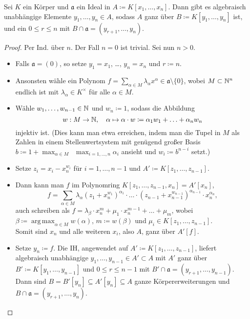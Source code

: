 \documentclass{cheat-sheet}
\DeclareMathOperator*{\argmax}{arg\,max}
\newcommand{\aaa}{\mathfrak{a}}
\begin{document}
\begin{prop}
  Sei $K$ ein Körper und $\aaa$ ein Ideal in $A \coloneqq K[x_1, \ldots, x_n]$.
  Dann gibt es algebraisch unabhängige Elemente $y_1, \ldots, y_n \in A$, sodass $A$ ganz über $B \coloneqq K[y_1, \ldots, y_n]$ ist, und ein $0 \leq r \leq n$ mit $B \cap \aaa = (y_{r+1}, \ldots, y_n)$.
\end{prop}

\begin{proof}
  Per Ind. über $n$. Der Fall $n=0$ ist trivial. Sei nun $n > 0$.
  \begin{itemize}
    \item Falls $\aaa = (0)$, so setze $y_1 = x_1$, \ldots, $y_n = x_n$ und $r \coloneqq n$.
    \item Ansonsten wähle ein Polynom $f = \sum_{\alpha \in M} \lambda_\alpha x^\alpha \in \aaa \setminus \{ 0 \}$, wobei $M \subset \mathbb{N}^n$ endlich ist mit $\lambda_\alpha \in K^{\times}$ für alle $\alpha \in M$.
    \item Wähle $w_1, \ldots, w_{n-1} \in \mathbb{N}$ und $w_n \coloneqq 1$, sodass die Abbildung
    \[
      w : M \to \mathbb{N}, \quad
      \alpha \mapsto \alpha \cdot w \coloneqq \alpha_1 w_1 + \ldots + \alpha_n w_n
    \]
    injektiv ist.
    (Dies kann man etwa erreichen, indem man die Tupel in $M$ als Zahlen in einem Stellenwertsystem mit genügend großer Basis $b \coloneqq 1 + \max_{\alpha \in M} \enspace \max_{i = 1, \ldots, n} \alpha_i$ ansieht und $w_i \coloneqq b^{n-i}$ setzt.)
    \item Setze $z_i = x_i - x_n^{w_i}$ für $i = 1, \ldots, n-1$ und $A' \coloneqq K[z_1, \ldots, z_{n-1}]$.
    \item Dann kann man $f$ im Polynomring $K[z_1, \ldots, z_{n-1}, x_n] = A'[x_n]$,
    \[
      f = \sum_{\alpha \in M} \lambda_\alpha (z_1 + x_n^{w_1})^{\alpha_1} \cdot \ldots \cdot (z_{n-1} + x_{n-1}^{w_{n-1}})^{\alpha_{n-1}} \cdot x_n^{\alpha_n},
    \]
     auch schreiben als $f = \lambda_\beta \cdot x_n^{m} + \mu_1 \cdot x_n^{m - 1} + \ldots + \mu_{m}$, wobei $\beta \coloneqq \argmax_{ \alpha \in M} w(\alpha)$, $m \coloneqq w(\beta)$ und $\mu_i \in K[z_1, \ldots, z_{n-1}]$. \\
     Somit sind $x_n$ und alle weiteren $x_i$, also $A$, ganz über $A'[f]$.
     \item Setze $y_n \coloneqq f$.
     Die IH, angewendet auf $A' \coloneqq K[z_1, \ldots, z_{n-1}]$, liefert algebraisch unabhängige $y_1, \ldots, y_{n-1} \in A' \subset A$ mit $A'$ ganz über $B' \coloneqq K[y_1, \ldots, y_{n-1}]$ und $0 \leq r \leq n-1$ mit $B' \cap \aaa = (y_{r+1}, \ldots, y_{n-1})$.
     Dann sind $B = B'[y_n] \subseteq A'[y_n] \subseteq A$ ganze Körpererweiterungen und $B \cap \aaa = (y_{r+1}, \ldots, y_n)$. \qedhere
  \end{itemize}
\end{proof}
\end{document}
